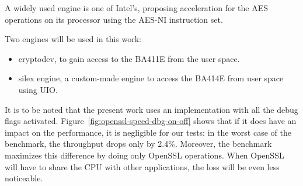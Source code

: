\noindent A widely used engine is one of Intel's, proposing acceleration for the AES operations on its processor using the AES-NI instruction set.

Two engines will be used in this work:
\begin{itemize}
	\item cryptodev, to gain access to the BA411E from the user space.
	\item silex engine, a custom-made engine to access the BA414E from user space using UIO.
\end{itemize}




It is to be noted that the present work uses an implementation with all the debug flags activated.
Figure~\ref{fig:openssl-speed-dbg-on-off} shows that if it does have an impact on the performance, it is negligible for our tests: in the worst case of the benchmark, the throughput drops only by 2.4\%.
Moreover, the benchmark maximizes this difference by doing only OpenSSL operations.
When OpenSSL will have to share the CPU with other applications, the loss will be even less noticeable.
